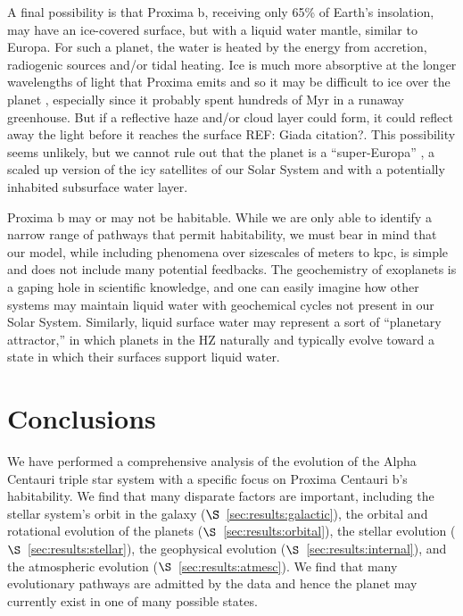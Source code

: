 \documentclass[preprint,12pt]{aastex}
\newcommand{\xxx}[1]{{\color{red} #1}} %
\newcommand{\xxx}[1]{{\color{red} #1}} %
\begin{document}
A final possibility is that Proxima b, receiving only 65\% of Earth's
insolation, may have an ice-covered surface, but with a liquid water
mantle, similar to Europa. For such a planet, the water is heated by
the energy from accretion, radiogenic sources and/or tidal
heating. Ice is much more absorptive at the longer wavelengths of
light that Proxima emits and so it may be difficult to ice over the
planet \xxx{\citep{Joshi12,Shields13}}, especially since it probably spent
hundreds of Myr in a runaway greenhouse. But if a reflective haze
and/or cloud layer could form, it could reflect away the light before
it reaches the surface \xxx{REF: Giada citation?}. This possibility seems unlikely, but we cannot
rule out that the planet is a ``super-Europa'' \citep{BarnesHeller13},
a scaled up version of the icy satellites of our Solar System and with
a potentially inhabited subsurface water layer.

Proxima b may or may not be habitable. While we are only able to
identify a narrow range of pathways that permit habitability, we must
bear in mind that our model, while including phenomena over sizescales
of meters to kpc, is simple and does not include many potential
feedbacks. The geochemistry of exoplanets is a gaping hole in
scientific knowledge, and one can easily imagine how other systems may
maintain liquid water with geochemical cycles not present in our Solar
System. Similarly, liquid surface water may represent a sort of
``planetary attractor,'' in which planets in the HZ naturally and
typically evolve toward a state in which their surfaces support liquid
water.

\section{Conclusions\label{sec:concl}}
We have performed a comprehensive analysis of the evolution of the
Alpha Centauri triple star system with a specific focus on Proxima Centauri b's
habitability. We find that many disparate factors are important,
including the stellar system's orbit in the galaxy
($\S$~\ref{sec:results:galactic}), the orbital and rotational evolution of
the planets ($\S$~\ref{sec:results:orbital}), the stellar evolution
($\S$~\ref{sec:results:stellar}), the geophysical evolution
($\S$~\ref{sec:results:internal}), and the atmospheric evolution
($\S$~\ref{sec:results:atmesc}). We find that many evolutionary pathways
are admitted by the data and hence the planet may currently exist in
one of many possible states.
\end{document}
